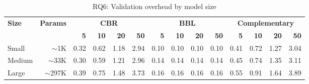 \begin{table}[t]
\centering
\caption{RQ6: Validation overhead by model size}
\vspace{-4mm}
\label{tab:rq6-overhead}
\small
\setlength{\tabcolsep}{1.6pt}
\begin{tabular}{@{}l r rrrr rrrr rrrr@{}}
\toprule
\textbf{Size} & \textbf{Params} &
\multicolumn{4}{c}{\textbf{CBR}} &
\multicolumn{4}{c}{\textbf{BBL}} &
\multicolumn{4}{c}{\textbf{Complementary}} \\
\cmidrule(lr){3-6}\cmidrule(lr){7-10}\cmidrule(lr){11-14}
& & \textbf{5} & \textbf{10} & \textbf{20} & \textbf{50}
  & \textbf{5} & \textbf{10} & \textbf{20} & \textbf{50}
  & \textbf{5} & \textbf{10} & \textbf{20} & \textbf{50} \\
\midrule
Small & $\sim$1K & 0.32 & 0.62 & 1.18 & 2.94 & 0.10 & 0.10 & 0.10 & 0.10 & 0.41 & 0.72 & 1.27 & 3.04 \\
Medium & $\sim$33K & 0.30 & 0.59 & 1.21 & 2.96 & 0.14 & 0.14 & 0.14 & 0.14 & 0.45 & 0.74 & 1.35 & 3.11 \\
Large & $\sim$297K & 0.39 & 0.75 & 1.48 & 3.73 & 0.16 & 0.16 & 0.16 & 0.16 & 0.55 & 0.91 & 1.64 & 3.89 \\
\bottomrule
\end{tabular}
\vspace{-4mm}
\end{table}